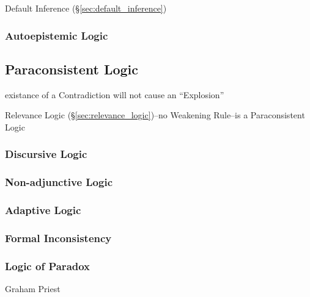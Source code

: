 Default Inference (\S\ref{sec:default_inference})



\subsubsection{Autoepistemic Logic}\label{sec:autoepistemic_logic}



\subsection{Paraconsistent Logic}\label{sec:paraconsistent_logic}

existance of a Contradiction will not cause an ``Explosion''

Relevance Logic (\S\ref{sec:relevance_logic})--no Weakening Rule--is a
Paraconsistent Logic



\subsubsection{Discursive Logic}\label{sec:discursive_logic}

\subsubsection{Non-adjunctive Logic}\label{sec:nonadjunctive_logic}

\subsubsection{Adaptive Logic}\label{sec:adaptive_logic}

\subsubsection{Formal Inconsistency}\label{sec:formal_inconsistency}

\subsubsection{Logic of Paradox}\label{sec:logic_of_paradox}

Graham Priest



